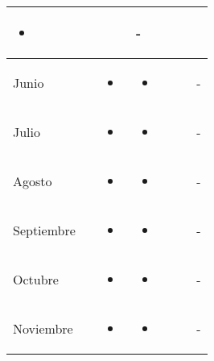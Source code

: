 \documentclass[landscape, a4paper, 10pt]{article}
\newcommand{\smallcellwidth}{0.7in}
\newcommand{\normalcellwidth}{1.2in}
\newcommand{\bigcellwidth}{2.0in}
\begin{document}
\begin{longtable}{|m{\smallcellwidth}|p{\normalcellwidth}|p{\bigcellwidth}|p{\bigcellwidth}|p{\normalcellwidth}|p{\normalcellwidth}|p{\normalcellwidth}|}
		\begin{itemize}
			\item 
		\end{itemize} &
		  &
		  &
		 - \\
		\hline
		Junio &
		 &
		\begin{itemize}
			\item 
		\end{itemize} &
		\begin{itemize}
			\item 
		\end{itemize} &
		  &
		  &
		 - \\
		\hline
		Julio &
		 &
		\begin{itemize}
			\item 
		\end{itemize} &
		\begin{itemize}
			\item 
		\end{itemize} &
		  &
		  &
		 - \\
		\hline
		Agosto &
		 &
		\begin{itemize}
			\item 
		\end{itemize} &
		\begin{itemize}
			\item 
		\end{itemize} &
		  &
		  &
		 - \\
		\hline
		Septiembre &
		 &
		\begin{itemize}
			\item 
		\end{itemize} &
		\begin{itemize}
			\item 
		\end{itemize} &
		  &
		  &
		 - \\
		\hline
		Octubre &
		 &
		\begin{itemize}
			\item 
		\end{itemize} &
		\begin{itemize}
			\item 
		\end{itemize} &
		  &
		  &
		 - \\
		\hline
		Noviembre &
		 &
		\begin{itemize}
			\item 
		\end{itemize} &
		\begin{itemize}
			\item 
		\end{itemize} &
		  &
		  &
		 - \\
		\hline

	\end{longtable}
\end{document}
